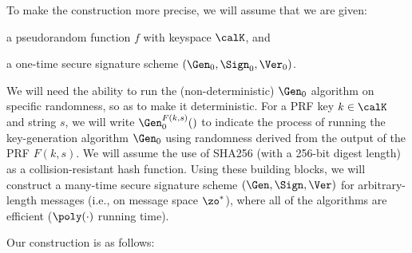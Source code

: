 To make the construction more precise, we will assume that we are given:
\begin{compactitem}
  \item a pseudorandom function $f$ with keyspace $\calK$, and
  \item a one-time secure signature scheme $(\Gen_0, \Sign_0, \Ver_0)$.
\end{compactitem}
We will need the ability to run the (non-deterministic) $\Gen_0$
algorithm on specific randomness, so as to make it deterministic.
For a PRF key $k \in \calK$ and string $s$, we will write $\Gen_0^{F(k,
s)}()$ to indicate the process of running the key-generation algorithm
$\Gen_0$ using randomness derived from the output of the PRF $F(k, s)$.
We will assume the use of SHA256 (with a 256-bit digest length) as
a collision-resistant hash function.  Using these building blocks,
we will construct a many-time secure signature scheme $(\Gen, \Sign,
\Ver)$ for arbitrary-length messages (i.e., on message space $\zo^\ast$),
where all of the algorithms are efficient ($\poly(\cdot)$ running time).

Our construction is as follows:

